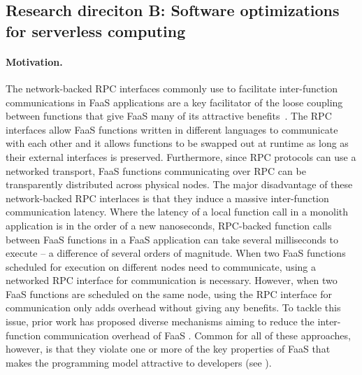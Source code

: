 \documentclass[../main.tex]{subfiles}
\begin{document}
\begin{refsection}[main-bib]

\subsection{Research direciton B: Software optimizations for serverless computing}

\paragraph{Motivation.}
The network-backed RPC interfaces commonly use to facilitate
inter-function communications in FaaS applications are a key
facilitator of the loose coupling between functions that give FaaS
many of its attractive
benefits~\cite{gan19_open_sourc_bench_suite_micros}. The RPC
interfaces allow FaaS functions written in different languages to
communicate with each other and it allows functions to be swapped out
at runtime as long as their external interfaces is
preserved. Furthermore, since RPC protocols can use a networked
transport, FaaS functions communicating over RPC can be transparently
distributed across physical nodes. The major disadvantage of these
network-backed RPC interlaces is that they induce a massive
inter-function communication latency. Where the latency of a local
function call in a monolith application is in the order of a new
nanoseconds, RPC-backed function calls between FaaS functions in a
FaaS application can take several milliseconds to execute -- a
difference of several orders of magnitude. When two FaaS functions
scheduled for execution on different nodes need to communicate, using
a networked RPC interface for communication is necessary. However,
when two FaaS functions are scheduled on the same node, using the RPC
interface for communication only adds overhead without giving any
benefits. To tackle this issue, prior work has proposed diverse
mechanisms aiming to reduce the inter-function communication overhead
of FaaS \cite{kotni21_faast,
  mahgoub22_wisef,barcelona-pons19_faas_track,sreekanti20_cloud,shillaker20_faasm,jia21_night}.
Common for all of these approaches, however, is that they violate one
or more of the key properties of FaaS that makes the programming model
attractive to developers (see ).



\end{refsection}
\end{document}
